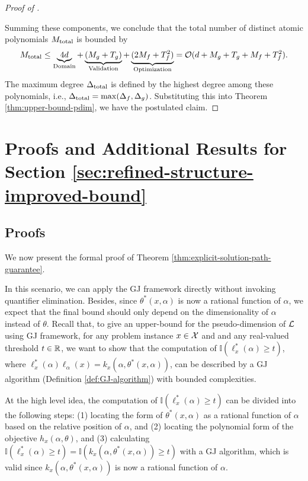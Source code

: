 \begin{proof}[Proof of ]
\begin{itemize}[leftmargin=*]
    \end{itemize}
    Summing these components, we conclude that the total number of distinct atomic polynomials $M_\textup{total}$ is bounded by
    \begin{equation*}
             M_\textup{total} \leq \underbrace{4d}_{\textup{Domain}} + \underbrace{(M_g + T_g)}_{\text{Validation}} +  \underbrace{(2M_f + T_f^2)}_{\textup{Optimization}} = \mathcal{O}(d + M_g + T_g + M_f + T_f^2).
    \end{equation*}
    The maximum degree $\Delta_\textup{total}$ is defined by the highest degree among these polynomials, i.e., $\Delta_\textup{total} = \max(\Delta_f, \Delta_g)$. Substituting this into Theorem \ref{thm:upper-bound-pdim}, we have the postulated claim.
\end{proof}

\section{Proofs and Additional Results for Section \ref{sec:refined-structure-improved-bound} } \label{apx:explicit-solution-path}

\subsection{Proofs}
We now present the formal proof of Theorem \ref{thm:explicit-solution-path-guarantee}.

    In this scenario, we can apply the GJ framework directly without invoking quantifier elimination. Besides, since $\theta^*(x, \alpha)$ is now a rational function of $\alpha$, we expect that the final bound should only depend on the dimensionality of $\alpha$ instead of $\theta$. Recall that, to give an upper-bound for the pseudo-dimension of $\mathcal{L}$ using GJ framework, for any problem instance $x \in \mathcal{X}$ and and any real-valued threshold $t \in \mathbb{R}$, we want to show that the computation of $\mathbb{I}(\ell^*_x(\alpha) \geq t)$, where $\ell^*_x(\alpha)  \ell_\alpha(x) = k_x(\alpha, \theta^*(x, \alpha))$, can be described by a GJ algorithm (Definition \ref{def:GJ-algorithm}) with bounded complexities. 

    At the high level idea, the computation of $\mathbb{I}(\ell^*_x(\alpha) \geq t)$ can be divided into the following steps: (1) locating the form of $\theta^*(x, \alpha)$ as a rational function of $\alpha$ based on the relative position of $\alpha$, and (2) locating the polynomial form of the objective $h_x(\alpha, \theta)$, and (3) calculating $\mathbb{I}(\ell^*_x(\alpha) \geq t) = \mathbb{I}(k_x(\alpha, \theta^*(x, \alpha)) \geq t)$ with a GJ algorithm, which is valid since $k_x(\alpha, \theta^*(x, \alpha))$ is now a rational function of $\alpha$.

